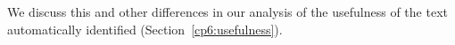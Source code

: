 

We discuss this and other differences in our analysis of the usefulness of the text 
automatically identified (Section~\ref{cp6:usefulness}).










